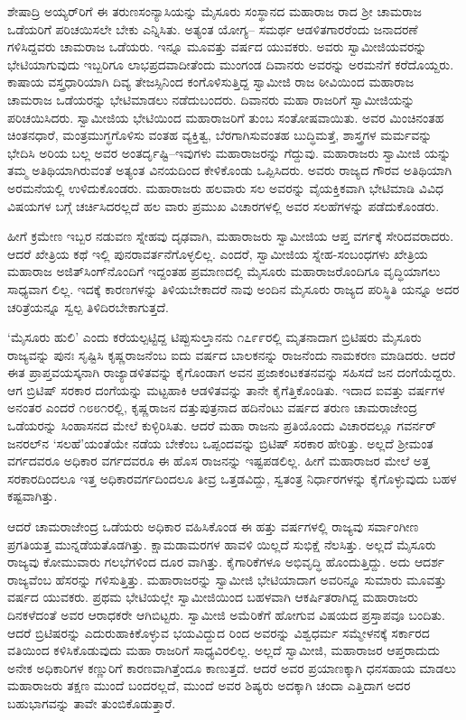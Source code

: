 ಶೇಷಾದ್ರಿ ಅಯ್ಯರ್​ರಿಗೆ ಈ ತರುಣಸಂನ್ಯಾಸಿಯನ್ನು ಮೈಸೂರು ಸಂಸ್ಥಾನದ ಮಹಾರಾಜ ರಾದ ಶ್ರೀ ಚಾಮರಾಜ ಒಡೆಯರಿಗೆ ಪರಿಚಯಿಸಲೇ ಬೇಕು ಎನ್ನಿಸಿತು. ಅತ್ಯಂತ ಯೋಗ್ಯ– ಸಮರ್ಥ ಆಡಳಿತಗಾರರೆಂದು ಜನಾದರಣೆ ಗಳಿಸಿದ್ದವರು ಚಾಮರಾಜ ಒಡೆಯರು. ಇನ್ನೂ ಮೂವತ್ತು ವರ್ಷದ ಯುವಕರು. ಅವರು ಸ್ವಾಮೀಜಿಯವರನ್ನು ಭೇಟಿಯಾಗುವುದು ಇಬ್ಬರಿಗೂ ಲಾಭಪ್ರದವಾದೀತೆಂದು ಮುಂಗಂಡ ದಿವಾನರು ಅವರನ್ನು ಅರಮನೆಗೆ ಕರೆದೊಯ್ದರು. ಕಾಷಾಯ ವಸ್ತ್ರಧಾರಿಯಾಗಿ ದಿವ್ಯ ತೇಜಸ್ಸಿನಿಂದ ಕಂಗೊಳಿಸುತ್ತಿದ್ದ ಸ್ವಾಮೀಜಿ ರಾಜ ಠೀವಿಯಿಂದ ಮಹಾರಾಜ ಚಾಮರಾಜ ಒಡೆಯರನ್ನು ಭೇಟಿಮಾಡಲು ನಡೆದುಬಂದರು. ದಿವಾನರು ಮಹಾ ರಾಜರಿಗೆ ಸ್ವಾಮೀಜಿಯನ್ನು ಪರಿಚಯಿಸಿದರು. ಸ್ವಾಮೀಜಿಯ ಭೇಟಿಯಿಂದ ಮಹಾರಾಜರಿಗೆ ತುಂಬ ಸಂತೋಷವಾಯಿತು. ಅವರ ಮಿಂಚಿನಂತಹ ಚಿಂತನಧಾರೆ, ಮಂತ್ರಮುಗ್ಧಗೊಳಿಸು ವಂತಹ ವ್ಯಕ್ತಿತ್ವ, ಬೆರಗಾಗಿಸುವಂತಹ ಬುದ್ಧಿಮತ್ತೆ, ಶಾಸ್ತ್ರಗಳ ಮರ್ಮವನ್ನು ಭೇದಿಸಿ ಅರಿಯ ಬಲ್ಲ ಅವರ ಅಂತರ್ದೃಷ್ಟಿ–ಇವುಗಳು ಮಹಾರಾಜರನ್ನು ಗೆದ್ದುವು. ಮಹಾರಾಜರು ಸ್ವಾಮೀಜಿ ಯನ್ನು ತಮ್ಮ ಅತಿಥಿಯಾಗಿರುವಂತೆ ಅತ್ಯಂತ ವಿನಯದಿಂದ ಕೇಳಿಕೊಂಡು ಒಪ್ಪಿಸಿದರು. ಅವರು ರಾಜ್ಯದ ಗೌರವ ಅತಿಥಿಯಾಗಿ ಅರಮನೆಯಲ್ಲಿ ಉಳಿದುಕೊಂಡರು. ಮಹಾರಾಜರು ಹಲವಾರು ಸಲ ಅವರನ್ನು ವೈಯಕ್ತಿಕವಾಗಿ ಭೇಟಿಮಾಡಿ ವಿವಿಧ ವಿಷಯಗಳ ಬಗ್ಗೆ ಚರ್ಚಿಸಿದರಲ್ಲದೆ ಹಲ ವಾರು ಪ್ರಮುಖ ವಿಚಾರಗಳಲ್ಲಿ ಅವರ ಸಲಹೆಗಳನ್ನು ಪಡೆದುಕೊಂಡರು.

ಹೀಗೆ ಕ್ರಮೇಣ ಇಬ್ಬರ ನಡುವಣ ಸ್ನೇಹವು ದೃಢವಾಗಿ, ಮಹಾರಾಜರು ಸ್ವಾಮೀಜಿಯ ಆಪ್ತ ವರ್ಗಕ್ಕೆ ಸೇರಿದವರಾದರು. ಆದರೆ ಖೇತ್ರಿಯ ಕಥೆ ಇಲ್ಲಿ ಪುನರಾವರ್ತನೆಗೊಳ್ಳಲಿಲ್ಲ. ಎಂದರೆ, ಸ್ವಾಮೀಜಿಯ ಸ್ನೇಹ-ಸಂಬಂಧಗಳು ಖೇತ್ರಿಯ ಮಹಾರಾಜ ಅಜಿತ್​ಸಿಂಗ್​ನೊಂದಿಗೆ ಇದ್ದಂತಹ ಪ್ರಮಾಣದಲ್ಲಿ ಮೈಸೂರು ಮಹಾರಾಜರೊಂದಿಗೂ ವೃದ್ಧಿಯಾಗಲು ಸಾಧ್ಯವಾಗ ಲಿಲ್ಲ. ಇದಕ್ಕೆ ಕಾರಣಗಳನ್ನು ತಿಳಿಯಬೇಕಾದರೆ ನಾವು ಅಂದಿನ ಮೈಸೂರು ರಾಜ್ಯದ ಪರಿಸ್ಥಿತಿ ಯನ್ನೂ ಅದರ ಚರಿತ್ರೆಯನ್ನೂ ಸ್ವಲ್ಪ ತಿಳಿದಿರಬೇಕಾಗುತ್ತದೆ.

‘ಮೈಸೂರು ಹುಲಿ’ ಎಂದು ಕರೆಯಲ್ಪಟ್ಟಿದ್ದ ಟಿಪ್ಪುಸುಲ್ತಾನನು ೧೭೯೯ರಲ್ಲಿ ಮೃತನಾದಾಗ ಬ್ರಿಟಿಷರು ಮೈಸೂರು ರಾಜ್ಯವನ್ನು ಪುನಃ ಸೃಷ್ಟಿಸಿ ಕೃಷ್ಣರಾಜನೆಂಬ ಐದು ವರ್ಷದ ಬಾಲಕನನ್ನು ರಾಜನೆಂದು ನಾಮಕರಣ ಮಾಡಿದರು. ಆದರೆ ಈತ ಪ್ರಾಪ್ತವಯಸ್ಕನಾಗಿ ರಾಜ್ಯಾಡಳಿತವನ್ನು ಕೈಗೊಂಡಾಗ ಅವನ ಪ್ರಜಾಕಂಟಕತನವನ್ನು ಸಹಿಸದೆ ಜನ ದಂಗೆಯೆದ್ದರು. ಆಗ ಬ್ರಿಟಿಷ್ ಸರಕಾರ ದಂಗೆಯನ್ನು ಮಟ್ಟಹಾಕಿ ಆಡಳಿತವನ್ನು ತಾನೇ ಕೈಗೆತ್ತಿಕೊಂಡಿತು. ಇದಾದ ಐವತ್ತು ವರ್ಷಗಳ ಅನಂತರ ಎಂದರೆ ೧೮೮೧ರಲ್ಲಿ, ಕೃಷ್ಣರಾಜನ ದತ್ತುಪುತ್ರನಾದ ಹದಿನೆಂಟು ವರ್ಷದ ತರುಣ ಚಾಮರಾಜೇಂದ್ರ ಒಡೆಯರನ್ನು ಸಿಂಹಾಸನದ ಮೇಲೆ ಕುಳ್ಳಿರಿಸಿತು. ಆದರೆ ಮಹಾ ರಾಜನು ಪ್ರತಿಯೊಂದು ವಿಚಾರದಲ್ಲೂ ಗವರ್ನರ್ ಜನರಲ್​ನ ‘ಸಲಹೆ’ಯಂತೆಯೇ ನಡೆಯ ಬೇಕೆಂಬ ಒಪ್ಪಂದವನ್ನು ಬ್ರಿಟಿಷ್ ಸರಕಾರ ಹೇರಿತ್ತು. ಅಲ್ಲದೆ ಶ್ರೀಮಂತ ವರ್ಗದವರೂ ಅಧಿಕಾರ ವರ್ಗದವರೂ ಈ ಹೊಸ ರಾಜನನ್ನು ಇಷ್ಟಪಡಲಿಲ್ಲ. ಹೀಗೆ ಮಹಾರಾಜರ ಮೇಲೆ ಅತ್ತ ಸರಕಾರದಿಂದಲೂ ಇತ್ತ ಅಧಿಕಾರವರ್ಗದಿಂದಲೂ ತೀವ್ರ ಒತ್ತಡವಿದ್ದು, ಸ್ವತಂತ್ರ ನಿರ್ಧಾರಗಳನ್ನು ಕೈಗೊಳ್ಳುವುದು ಬಹಳ ಕಷ್ಟವಾಗಿತ್ತು.

ಆದರೆ ಚಾಮರಾಜೇಂದ್ರ ಒಡೆಯರು ಅಧಿಕಾರ ವಹಿಸಿಕೊಂಡ ಈ ಹತ್ತು ವರ್ಷಗಳಲ್ಲಿ ರಾಜ್ಯವು ಸರ್ವಾಂಗೀಣ ಪ್ರಗತಿಯತ್ತ ಮುನ್ನಡೆಯತೊಡಗಿತ್ತು. ಕ್ಷಾಮಡಾಮರಗಳ ಹಾವಳಿ ಯಿಲ್ಲದೆ ಸುಭಿಕ್ಷೆ ನೆಲಸಿತ್ತು. ಅಲ್ಲದೆ ಮೈಸೂರು ರಾಜ್ಯವು ಕೋಮುವಾರು ಗಲಭೆಗಳಿಂದ ದೂರ ವಾಗಿತ್ತು. ಕೈಗಾರಿಕೆಗಳೂ ಅಭಿವೃದ್ಧಿ ಹೊಂದುತ್ತಿದ್ದು. ಅದು ಆದರ್ಶ ರಾಜ್ಯವೆಂಬ ಹೆಸರನ್ನು ಗಳಿಸುತ್ತಿತ್ತು. ಮಹಾರಾಜರನ್ನು ಸ್ವಾಮೀಜಿ ಭೇಟಿಯಾದಾಗ ಅವರಿನ್ನೂ ಸುಮಾರು ಮೂವತ್ತು ವರ್ಷದ ಯುವಕರು. ಪ್ರಥಮ ಭೇಟಿಯಲ್ಲೇ ಸ್ವಾಮೀಜಿಯಿಂದ ಬಹಳವಾಗಿ ಆಕರ್ಷಿತರಾಗಿದ್ದ ಮಹಾರಾಜರು ದಿನಕಳೆದಂತೆ ಅವರ ಆರಾಧಕರೇ ಆಗಿಬಿಟ್ಟರು. ಸ್ವಾಮೀಜಿ ಅಮೆರಿಕೆಗೆ ಹೋಗುವ ವಿಷಯದ ಪ್ರಸ್ತಾಪವೂ ಬಂದಿತು. ಆದರೆ ಬ್ರಿಟಿಷರನ್ನು ಎದುರುಹಾಕಿಕೊಳ್ಳುವ ಭಯವಿದ್ದುದ ರಿಂದ ಅವರನ್ನು ವಿಶ್ವಧರ್ಮ ಸಮ್ಮೇಳನಕ್ಕೆ ಸರ್ಕಾರದ ವತಿಯಿಂದ ಕಳಿಸಿಕೊಡುವುದು ಮಹಾ ರಾಜರಿಗೆ ಸಾಧ್ಯವಿರಲಿಲ್ಲ. ಅಲ್ಲದೆ ಸ್ವಾಮೀಜಿ, ಮಹಾರಾಜರ ಆಪ್ತರಾದುದು ಅನೇಕ ಅಧಿಕಾರಿಗಳ ಕಣ್ಣುರಿಗೆ ಕಾರಣವಾಗಿತ್ತೆಂದೂ ಕಾಣುತ್ತದೆ. ಆದರೆ ಅವರ ಪ್ರಯಾಣಕ್ಕಾಗಿ ಧನಸಹಾಯ ಮಾಡಲು ಮಹಾರಾಜರು ತಕ್ಷಣ ಮುಂದೆ ಬಂದರಲ್ಲದೆ, ಮುಂದೆ ಅವರ ಶಿಷ್ಯರು ಅದಕ್ಕಾಗಿ ಚಂದಾ ಎತ್ತಿದಾಗ ಅದರ ಬಹುಭಾಗವನ್ನು ತಾವೇ ತುಂಬಿಕೊಡುತ್ತಾರೆ.

